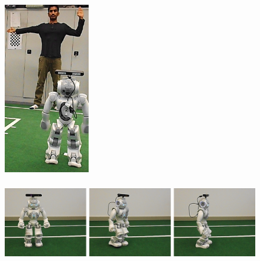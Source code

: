 \begin{figure}
	[h] 
	\begin{minipage}
		{1 
		\textwidth} \centering 
		\includegraphics[height=75mm]{figures/result/res-ges-turn-right.png} \caption*{} 
	\end{minipage}
	\begin{minipage}
		{1 
		\textwidth} 
		\includegraphics[height=42mm]{figures/result/nao-gm-turn-right.png} 
	\end{minipage}
\end{figure}
